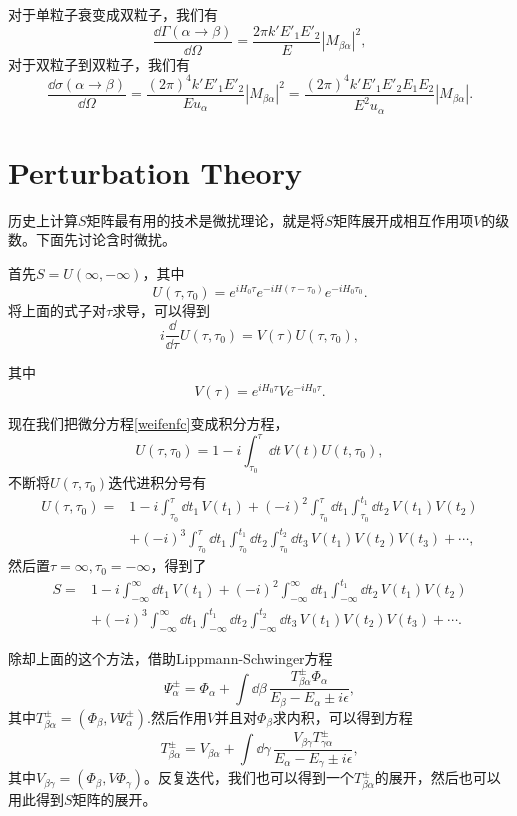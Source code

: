 对于单粒子衰变成双粒子，我们有
\[
	\frac{\dd \Gamma(\alpha\to \beta)}{\dd \Omega} =\frac{2\pi k'E'_1 E'_2}{E}|M_{\beta\alpha}|^2,
\]
对于双粒子到双粒子，我们有
\[
	\frac{\dd \sigma(\alpha\to \beta)}{\dd \Omega} =\frac{(2\pi)^4 k'E'_1 E'_2}{Eu_\alpha}|M_{\beta\alpha}|^2=\frac{(2\pi)^4 k'E'_1 E'_2 E_1 E_2}{E^2 u_\alpha}|M_{\beta\alpha}|.
\]
\section{Perturbation Theory}
历史上计算$S$矩阵最有用的技术是微扰理论，就是将$S$矩阵展开成相互作用项$V$的级数。下面先讨论含时微扰。

首先$S=U(\infty,-\infty)$，其中
\[
	U(\tau,\tau_0)=e^{iH_0\tau}e^{-iH(\tau-\tau_0)}e^{-iH_0\tau_0}.
\]
将上面的式子对$\tau$求导，可以得到
\begin{equation}
\label{weifenfc}
	i\frac{\dd}{\dd\tau}U(\tau,\tau_0)=V(\tau)U(\tau,\tau_0),
\end{equation}

其中
\[
	V(\tau)=e^{iH_0 \tau}Ve^{-iH_0 \tau}.
\]

现在我们把微分方程\eqref{weifenfc}变成积分方程，
\[
	U(\tau,\tau_0)=1-i\int_{\tau_0}^{\tau}\dd t \, V(t)U(t,\tau_0),
\]
不断将$U(\tau,\tau_0)$迭代进积分号有
\[
\begin{split}
	U(\tau,\tau_0)=&1-i\int_{\tau_0}^{\tau}\dd t_1 \, V(t_1)+(-i)^2\int_{\tau_0}^{\tau}\dd t_1\int_{\tau_0}^{t_1}\dd t_2\, V(t_1)V(t_2)\\
	&+(-i)^3\int_{\tau_0}^{\tau}\dd t_1\int_{\tau_0}^{t_1}\dd t_2\int_{\tau_0}^{t_2}\dd t_3\, V(t_1)V(t_2)V(t_3)+\cdots,
\end{split}
\]
然后置$\tau=\infty,\tau_0=-\infty$，得到了
\begin{equation}
\label{weirao}
\begin{split}
	S=&1-i\int_{-\infty}^{\infty}\dd t_1 \, V(t_1)+(-i)^2\int_{-\infty}^{\infty}\dd t_1\int_{-\infty}^{t_1}\dd t_2\, V(t_1)V(t_2)\\
	&+(-i)^3\int_{-\infty}^{\infty}\dd t_1\int_{-\infty}^{t_1}\dd t_2\int_{-\infty}^{t_2}\dd t_3\, V(t_1)V(t_2)V(t_3)+\cdots.
\end{split}
\end{equation}

除却上面的这个方法，借助Lippmann-Schwinger方程
\[
\Psi_\alpha^\pm=\Phi_\alpha+\int \dd \beta \,\frac{T^\pm_{\beta\alpha}\Phi_\alpha}{E_\beta-E_\alpha\pm i\epsilon},
\]
其中$T^\pm_{\beta\alpha}=(\Phi_\beta,V\Psi_\alpha^\pm)$.然后作用$V$并且对$\Phi_\beta$求内积，可以得到方程
\[
T^\pm_{\beta\alpha}=V_{\beta\alpha}+\int \dd \gamma\, \frac{V_{\beta\gamma}T^\pm_{\gamma\alpha}}{E_\alpha-E_\gamma\pm i\epsilon},
\]
其中$V_{\beta\gamma}=(\Phi_\beta,V\Phi_\gamma)$。反复迭代，我们也可以得到一个$T^\pm_{\beta\alpha}$的展开，然后也可以用此得到$S$矩阵的展开。

